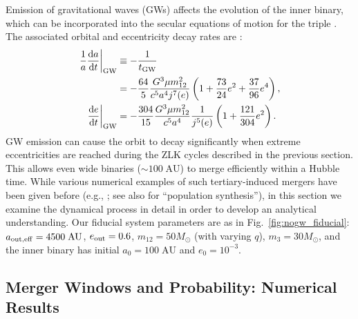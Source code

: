 \documentclass[
        fleqn,
        usenatbib,
    ]{mnras}
\newcommand*{\rd}[2]{\frac{\mathrm{d}#1}{\mathrm{d}#2}}
\newcommand*{\at}[1]{\left.#1\right|}
\newcommand*{\p}[1]{\left(#1\right)}
\begin{document}
Emission of gravitational waves (GWs) affects the evolution of the inner
binary, which can be incorporated into the secular equations of motion for the
triple \citep[e.g.,][]{peters1964, LL18}. The associated orbital and eccentricity
decay rates are \citep{peters1964}:
\begin{align}
    \at{\frac{1}{a}\rd{a}{t}}_{\rm GW} &\equiv -\frac{1}{t_{\rm GW}}\nonumber\\
        &= -\frac{64}{5}\frac{G^3 \mu m_{12}^2}{c^5a^4j^7(e)}
            \p{1 + \frac{73}{24}e^2 + \frac{37}{96}e^4}\label{eq:def_tgw},\\
    \at{\rd{e}{t}}_{\rm GW} &= -\frac{304}{15}\frac{G^3 \mu m_{12}^2}{c^5a^4}
        \frac{1}{j^{5}(e)}\p{1 + \frac{121}{304}e^2}\label{eq:dedt_gw}.
\end{align}
GW emission can cause the orbit to decay significantly when extreme
eccentricities are reached during the ZLK cycles described in the previous
section. This allows even wide binaries ($\sim 100\;\mathrm{AU}$) to merge
efficiently within a Hubble time. While various numerical examples of such
tertiary-induced mergers have been given before (e.g., \citet{LL18}; see also
\citet{LL19} for ``population synthesis''), in this section we examine the
dynamical process in detail in order to develop an analytical understanding. Our
fiducial system parameters are as in Fig.~\ref{fig:nogw_fiducial}: $a_{\rm out,
eff} = 4500\;\mathrm{AU}$, $e_{\rm out} = 0.6$, $m_{12} = 50M_{\odot}$ (with
varying $q$), $m_3 = 30M_{\odot}$, and the inner binary has initial $a_0 =
100\;\mathrm{AU}$ and $e_0 = 10^{-3}$.

\subsection{Merger Windows and Probability: Numerical Results}\label{ss:windows}
\end{document}
